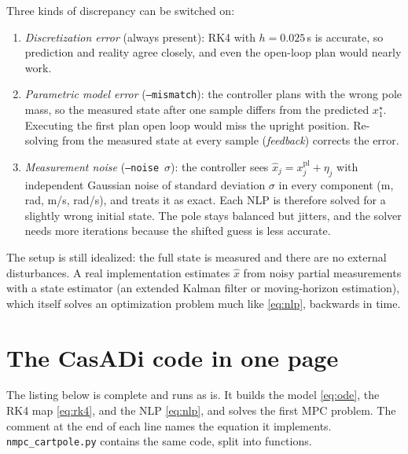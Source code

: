 \documentclass[11pt]{article}
\begin{document}
\noindent Three kinds of discrepancy can be switched on:
\begin{enumerate}
\item \emph{Discretization error} (always present): RK4 with $h=0.025$\,s is accurate,
  so prediction and reality agree closely, and even the open-loop plan would nearly work.
\item \emph{Parametric model error} (\texttt{--mismatch}): the controller plans with the
  wrong pole mass, so the measured state after one sample differs from the predicted
  $x^\star_1$. Executing the first plan open loop would miss the upright position.
  Re-solving from the measured state at every sample (\emph{feedback}) corrects the error.
\item \emph{Measurement noise} (\texttt{--noise}~$\sigma$): the controller sees
  $\hat x_j = x^{\mathrm{pl}}_j + \eta_j$ with independent Gaussian noise of standard
  deviation $\sigma$ in every component (m, rad, m/s, rad/s), and treats it as exact.
  Each NLP is therefore solved for a slightly wrong initial state. The pole stays
  balanced but jitters, and the solver needs more iterations because the shifted guess
  is less accurate.
\end{enumerate}
The setup is still idealized: the full state is measured and there are no external
disturbances. A real implementation estimates $\hat x$ from noisy partial measurements
with a state estimator (an extended Kalman filter or moving-horizon estimation), which
itself solves an optimization problem much like \eqref{eq:nlp}, backwards in time.

\section{The CasADi code in one page}

The listing below is complete and runs as is. It builds the model \eqref{eq:ode}, the
RK4 map \eqref{eq:rk4}, and the NLP \eqref{eq:nlp}, and solves the first MPC problem.
The comment at the end of each line names the equation it implements.
\texttt{nmpc\_cartpole.py} contains the same code, split into functions.
\end{document}
